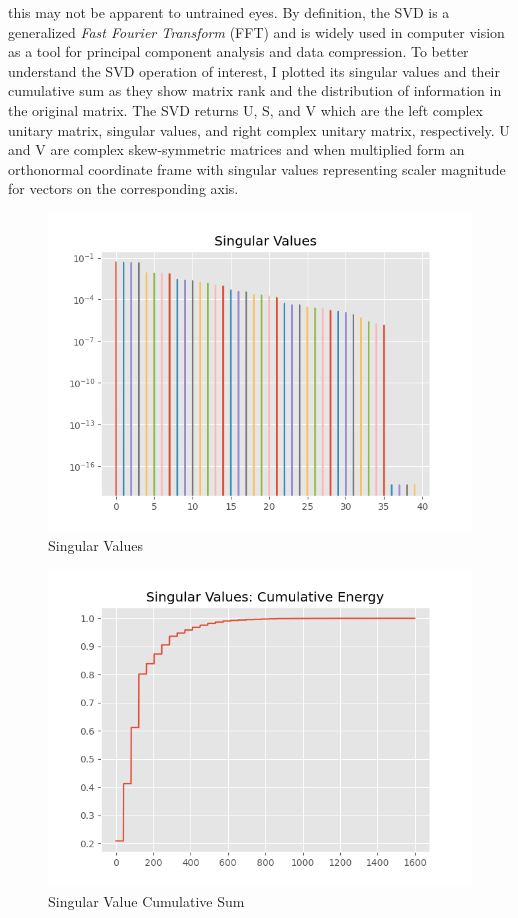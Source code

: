 \documentclass[11pt]{article}
\begin{document}
\begin{itemize}
    this may not be apparent to untrained eyes. By definition, the SVD is a
    generalized \emph{Fast Fourier Transform} (FFT) and is widely used in
    computer vision as a tool for principal component analysis and data compression.
    To better understand the SVD operation of interest, I plotted its
    singular values and their cumulative sum as they show matrix rank and the
    distribution of information in the original matrix. The SVD returns U, S, and V
    which are the left complex unitary matrix, singular values, and right
    complex unitary matrix, respectively. U and V are complex skew-symmetric
    matrices and when multiplied form an orthonormal coordinate frame with
    singular values representing scaler magnitude for vectors on the corresponding
    axis.


    \begin{figure}
      \includegraphics[width=\linewidth]{quest_svd-A_S_eVals.png}
      \caption{Singular Values}
      \label{fig:eVals}
    \end{figure}

    \begin{figure}
      \includegraphics[width=\linewidth]{quest_svd-A_S_cumEnergy.png}
      \caption{Singular Value Cumulative Sum}
      \label{fig:cumsum}
    \end{figure}



\end{itemize}
\end{document}
